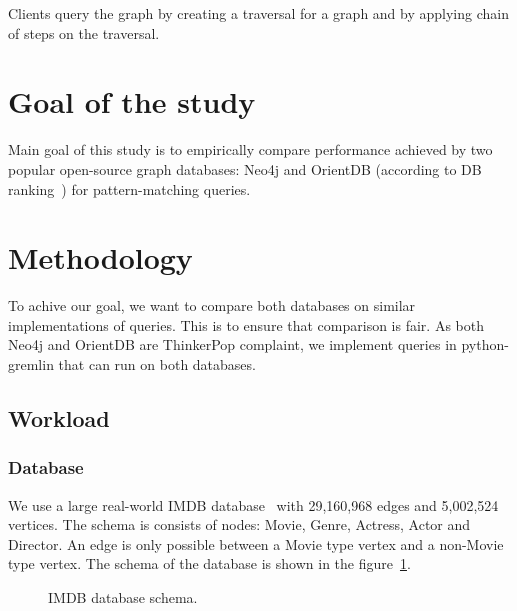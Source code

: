 Clients query the graph by creating a traversal for a graph and by applying chain of steps on the traversal.

\section{Goal of the study}

Main goal of this study is to empirically compare performance achieved by two popular open-source graph databases: Neo4j and OrientDB (according to DB ranking~\cite{dbranking}) for pattern-matching queries.

\section{Methodology}

To achive our goal, we want to compare both databases on similar implementations of queries. This is to ensure that comparison is fair. As both Neo4j and OrientDB are ThinkerPop complaint, we implement queries in python-gremlin that can run on both databases. 

\subsection{Workload}

\subsubsection{Database}

We use a large real-world IMDB database~\cite{IMDb96:online} with 29,160,968 edges and 5,002,524 vertices. The schema is consists of nodes: Movie, Genre,
Actress, Actor and Director. An edge is only possible between a Movie type vertex and a non-Movie type vertex. 
The schema of the database is shown in the figure~\ref{fig:schema}. 

\begin{figure}[t]
\centering
{}
\caption{IMDB database schema.}
\label{fig:schema}
\centering
\end{figure}


